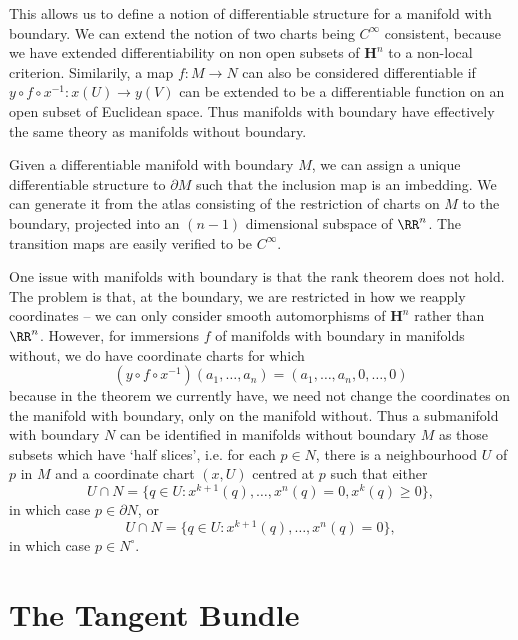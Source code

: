 This allows us to define a notion of differentiable structure for a manifold with boundary. We can extend the notion of two charts being $C^\infty$ consistent, because we have extended differentiability on non open subsets of $\mathbf{H}^n$ to a non-local criterion. Similarily, a map $f: M \to N$ can also be considered differentiable if $y \circ f \circ x^{-1}:x(U) \to y(V)$ can be extended to be a differentiable function on an open subset of Euclidean space. Thus manifolds with boundary have effectively the same theory as manifolds without boundary.

\begin{example}
    Given a differentiable manifold with boundary $M$, we can assign a unique differentiable structure to $\partial M$ such that the inclusion map is an imbedding. We can generate it from the atlas consisting of the restriction of charts on $M$ to the boundary, projected into an $(n-1)$ dimensional subspace of $\RR^n$. The transition maps are easily verified to be $C^\infty$.
\end{example}

One issue with manifolds with boundary is that the rank theorem does not hold. The problem is that, at the boundary, we are restricted in how we reapply coordinates -- we can only consider smooth automorphisms of $\mathbf{H}^n$ rather than $\RR^n$. However, for immersions $f$ of manifolds with boundary in manifolds without, we do have coordinate charts for which
%
\[ (y \circ f \circ x^{-1})(a_1, \dots, a_n) = (a_1, \dots, a_n, 0, \dots, 0) \]
%
because in the theorem we currently have, we need not change the coordinates on the manifold with boundary, only on the manifold without. Thus a submanifold with boundary $N$ can be identified in manifolds without boundary $M$ as those subsets which have `half slices', i.e. for each $p \in N$, there is a neighbourhood $U$ of $p$ in $M$ and a coordinate chart $(x,U)$ centred at $p$ such that either
%
\[ U \cap N = \{ q \in U : x^{k+1}(q), \dots, x^n(q) = 0, x^k(q) \geq 0 \}, \]
%
in which case $p \in \partial N$, or
%
\[ U \cap N = \{ q \in U : x^{k+1}(q), \dots, x^n(q) = 0 \}, \]
%
in which case $p \in N^\circ$.




\chapter{The Tangent Bundle}

